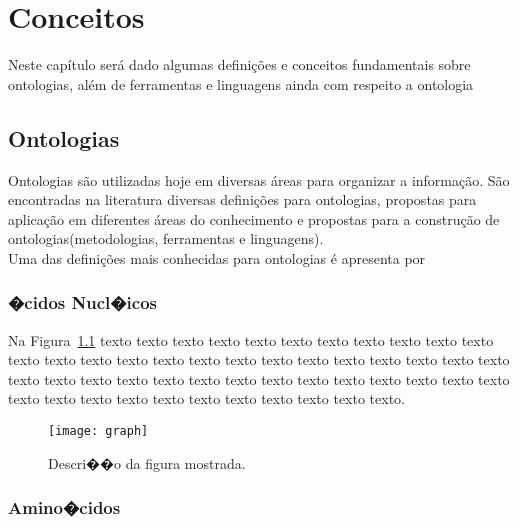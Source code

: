 \chapter{Conceitos}
\label{cap:conceitos}

Neste capítulo será dado algumas definições e conceitos fundamentais sobre ontologias,
além de ferramentas e linguagens ainda com respeito a ontologia

\section{Ontologias}
\label{sec:definicao}

Ontologias são utilizadas hoje em diversas áreas para organizar a informação. São
encontradas na literatura diversas definições para ontologias, propostas para 
aplicação em diferentes áreas do conhecimento e propostas para a construção de 
ontologias(metodologias, ferramentas e linguagens).\\
Uma das definições mais conhecidas para ontologias é apresenta por \cite{gruber1995toward}

\subsection{�cidos Nucl�icos}
\label{sec:acidos_nucleicos}

Na Figura~\ref{fig:humanbeta} texto texto texto texto texto texto texto texto
texto texto texto texto texto texto texto texto texto texto texto texto texto
texto texto texto texto texto texto texto texto texto texto texto texto texto
texto texto texto texto texto texto texto texto texto texto texto texto texto
texto texto texto.

\begin{figure}[!h]
  \centering
  \texttt{[image: graph]} 
  \caption{Descri��o da figura mostrada.}
  \label{fig:humanbeta} 
\end{figure}

\subsection{Amino�cidos}
\label{sec:amino_acidos}

